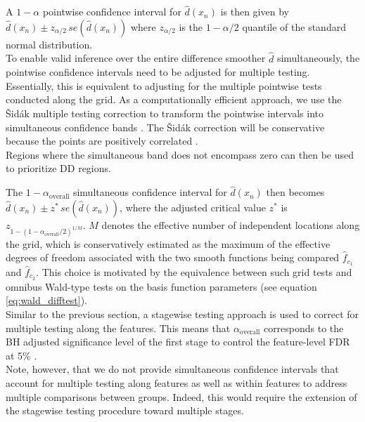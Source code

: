 A $1-\alpha$ pointwise confidence interval for $\hat{d}(x_n)$ is then given by $\hat{d}(x_n) \pm  z_{\alpha/2}\,se(\hat{d}(x_n))$ where $z_{\alpha/2}$ is the $1-\alpha/2$ quantile of the standard normal distribution.\\
To enable valid inference over the entire difference smoother $\hat{d}$ simultaneously, the pointwise confidence intervals need to be adjusted for multiple testing. Essentially, this is equivalent to adjusting for the multiple pointwise tests conducted along the grid. As a computationally efficient approach, we use the Šidák multiple testing correction to transform the pointwise intervals into simultaneous confidence bands \cite{sidak}. The Šidák correction will be conservative because the points are positively correlated \cite{simes}.\\
Regions where the simultaneous band does not encompass zero can then be used to prioritize DD regions.

The $1-\alpha_{\text{overall}}$ simultaneous confidence interval for $\hat{d}(x_n)$ then becomes $\hat{d}(x_n) \pm  z^*\,se(\hat{d}(x_n))$, where the adjusted critical value $z^*$ is $z_{1-{(1-\alpha_{\text{overall}}/2)}^{1/M}}$.
$M$ denotes the effective number of independent locations along the grid, which is conservatively estimated as the maximum of the effective degrees of freedom associated with the two smooth functions being compared $\hat{f}_{c_1}$ and $\hat{f}_{c_2}$. This choice is motivated by the equivalence between such grid tests and omnibus Wald-type tests on the basis function parameters (see equation \ref{eq:wald_difftest}).\\

Similar to the previous section, a stagewise testing approach is used to correct for multiple testing along the features. This means that $\alpha_{\text{overall}}$ corresponds to the BH adjusted significance level of the first stage to control the feature-level FDR at 5\% \cite{stagewise_testing}.\\
Note, however, that we do not provide simultaneous confidence intervals that account for multiple testing along features as well as within features to address multiple comparisons between groups. Indeed, this would require the extension of the stagewise testing procedure toward multiple stages.

